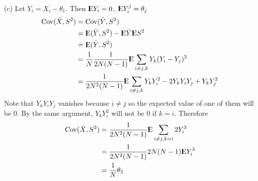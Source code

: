 \documentclass[12pt]{article}
\begin{document}
(c)
 Let $Y_i = X_i - \theta_1$. Then ${\rm I\kern-.3em E} Y_i = 0$, ${\rm I\kern-.3em E} Y_i^j = \theta_j$
 $$\begin{aligned}
	\mathrm{Cov}(\bar{X}, S^2) &= \mathrm{Cov}(\bar{Y}, S^2) \\
	 &= {\rm I\kern-.3em E}(\bar{Y}, S^2) - {\rm I\kern-.3em E} \bar{Y} {\rm I\kern-.3em E} S^2 \\
	 &= {\rm I\kern-.3em E}(\bar{Y}, S^2) \\
	 &= \frac{1}{N} \frac{1}{2N(N-1)} {\rm I\kern-.3em E} \sum_{i\neq j, k} Y_k (Y_i - Y_j)^2 \\
	 &= \frac{1}{2N^2(N-1)} {\rm I\kern-.3em E} \sum_{i\neq j, k} Y_kY_i^2 - 2Y_k Y_iY_j + Y_k Y_j^2 \\
\end{aligned}$$
Note that $Y_k Y_iY_j$ vanishes because $i \neq j$ so the expected value of one of them will be 0. By the same argument,  $Y_kY_i^2$ will not be 0 if $k=i$. Therefore 
 $$\begin{aligned}
	\mathrm{Cov}(\bar{X}, S^2) &=\frac{1}{2N^2(N-1)} {\rm I\kern-.3em E} \sum_{i\neq j, k=i} 2 Y_i^3 \\
	&= \frac{1}{2N^2(N-1)} 2N(N-1) {\rm I\kern-.3em E} Y_i^3 \\
	&= \frac{1}{N } \theta_3 \\
\end{aligned}$$
\QED
\end{document}
